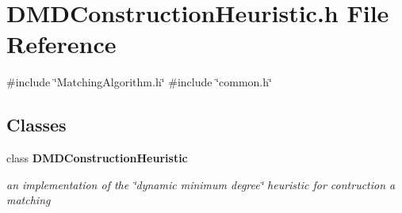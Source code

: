 \section{D\+M\+D\+Construction\+Heuristic.\+h File Reference}
\label{DMDConstructionHeuristic_8h}
{\ttfamily \#include \char`\"{}Matching\+Algorithm.\+h\char`\"{}}\newline
{\ttfamily \#include \char`\"{}common.\+h\char`\"{}}\newline
\subsection*{Classes}
\begin{DoxyCompactItemize}
\item 
class \textbf{ D\+M\+D\+Construction\+Heuristic}
\begin{DoxyCompactList}\small\item\em an implementation of the \char`\"{}dynamic minimum degree\char`\"{} heuristic for contruction a matching \end{DoxyCompactList}\end{DoxyCompactItemize}
